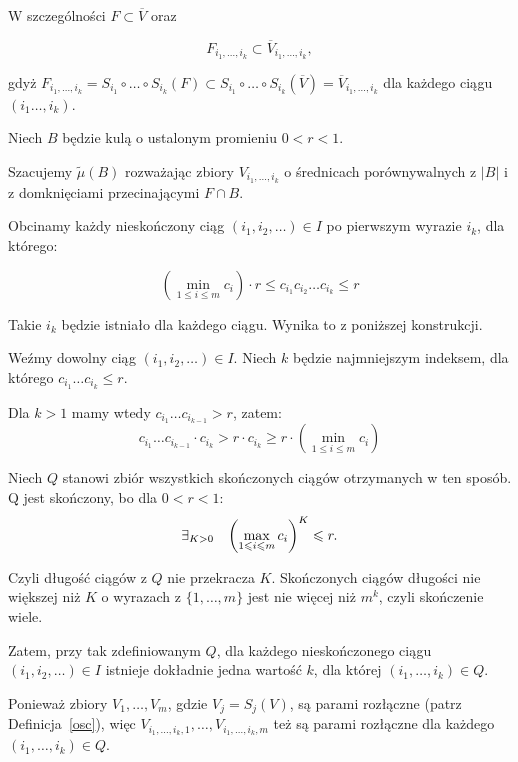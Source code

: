 \documentclass{mini}
\begin{document}
\begin{dow}
W szczególności $ F \subset \overline{V} $ oraz 

\begin{equation}\label{zaw}
F_{i_1,\ldots,i_k}\subset \overline{V}_{i_1,\ldots,i_k},
\end{equation}

gdyż $ F_{i_1,\ldots,i_k}=S_{i_1}\circ\ldots\circ S_{i_k}(F) \subset S_{i_1}\circ\ldots\circ S_{i_k}(\overline{V})=\overline{V}_{i_1,\ldots,i_k} $ dla każdego ciągu $(i_1\ldots,i_k)$.

Niech $B$ będzie kulą o ustalonym promieniu $0<r<1$.

Szacujemy $\tilde{\mu}(B)$ rozważając zbiory $ V_{i_1,\ldots,i_k} $ o średnicach porównywalnych z $|B|$ i z domknięciami przecinającymi $F \cap B$.

Obcinamy każdy nieskończony ciąg $(i_1,i_2,\ldots) \in I$ po pierwszym wyrazie $i_k$, dla którego:

\begin{equation}\label{rrr}
\left(\min_{1 \leqslant i \leqslant m} c_i\right)\cdot r \leqslant c_{i_1} c_{i_2 }\ldots c_{i_k} \leqslant r
\end{equation}

Takie $i_k$ będzie istniało dla każdego ciągu. Wynika to z poniższej konstrukcji. 
 
Weźmy dowolny ciąg $(i_1,i_2,\ldots) \in I$. Niech $k$ będzie najmniejszym indeksem, dla którego $c_{i_1}\ldots c_{i_k} \leqslant r$. 

Dla $k>1$ mamy wtedy $c_{i_1}\ldots c_{i_{k-1}} > r$, zatem:
$$
\displaystyle c_{i_1}\ldots c_{i_{k-1}}\cdot c_{i_k} > r \cdot c_{i_k} \geqslant r \cdot \left(\min_{1\leqslant i\leqslant m} c_i\right)
$$

Niech $Q$ stanowi zbiór wszystkich skończonych ciągów otrzymanych w ten sposób. Q jest skończony, bo dla $0<r<1$:
$$
\exists_{K>0} \hspace{3mm} \left(\max_{{1\leqslant i\leqslant m}} c_i\right)^K \leqslant r. 
$$

Czyli długość ciągów z $Q$ nie przekracza $K$. Skończonych ciągów długości nie większej niż $K$ o wyrazach z $\lbrace 1,\ldots,m\rbrace$ jest nie więcej niż $m^k$, czyli skończenie wiele.

Zatem, przy tak zdefiniowanym $Q$, dla każdego nieskończonego ciągu  $(i_1,i_2,\ldots)\in I$ istnieje dokładnie jedna wartość $k$, dla której $(i_1,\ldots,i_k) \in Q$.

Ponieważ zbiory $V_1,\ldots,V_m$, gdzie $V_j=S_j(V)$, są parami rozłączne (patrz Definicja~\ref{osc}), więc $V_{i_1,\ldots,i_k,1},\ldots,V_{i_1,\ldots,i_k,m}$ też są parami rozłączne dla każdego $(i_1,\ldots,i_k) \in Q$.


\end{dow}
\end{document}
